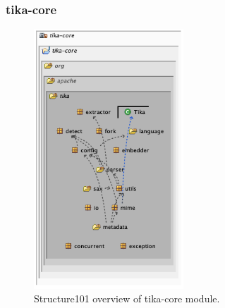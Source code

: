 \documentclass{article}
\begin{document}
\subsubsection{tika-core}
\begin{figure}[ht]
    \centering
    \includegraphics[width=0.5\textwidth]{report/images/tika_core/s101}
    \caption{Structure101 overview of tika-core module.}
    \label{fig:tika_core/s101}
\end{figure}
\end{document}
